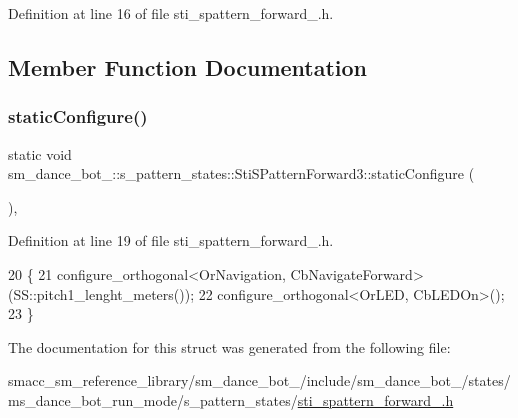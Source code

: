Definition at line 16 of file sti\+\_\+spattern\+\_\+forward\+\_.\+h.



\subsection{Member Function Documentation}
\mbox{\label{structsm__dance__bot__2_1_1s__pattern__states_1_1StiSPatternForward3_a7862e1430240ac17d696d547e12872af}} 
\subsubsection{\texorpdfstring{static\+Configure()}{staticConfigure()}}
{\footnotesize\ttfamily static void sm\+\_\+dance\+\_\+bot\+\_\+::s\+\_\+pattern\+\_\+states\+::\+Sti\+S\+Pattern\+Forward3\+::static\+Configure (\begin{DoxyParamCaption}{ }\end{DoxyParamCaption})\hspace{0.3cm}{\ttfamily [inline]}, {\ttfamily [static]}}



Definition at line 19 of file sti\+\_\+spattern\+\_\+forward\+\_.\+h.


\begin{DoxyCode}
20   \{
21     configure\_orthogonal<OrNavigation, CbNavigateForward>(SS::pitch1\_lenght\_meters());
22     configure\_orthogonal<OrLED, CbLEDOn>();
23   \}
\end{DoxyCode}


The documentation for this struct was generated from the following file\+:\begin{DoxyCompactItemize}
\item 
smacc\+\_\+sm\+\_\+reference\+\_\+library/sm\+\_\+dance\+\_\+bot\+\_/include/sm\+\_\+dance\+\_\+bot\+\_/states/ms\+\_\+dance\+\_\+bot\+\_\+run\+\_\+mode/s\+\_\+pattern\+\_\+states/\hyperlink{2_2include_2sm__dance__bot__2_2states_2ms__dance__bot__run__mode_2s__pattern__states_2sti__spattern__forward__3_8h}{sti\+\_\+spattern\+\_\+forward\+\_.\+h}\end{DoxyCompactItemize}
